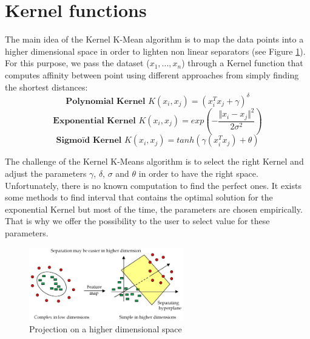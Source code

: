 \section{Kernel functions}
The main idea of the Kernel K-Mean algorithm is to map the data points into a higher dimensional space in order to lighten non linear separators (see Figure \ref{kern}). For this purpose, we pass the dataset ($x_1,...,x_n$) through a Kernel function that computes affinity between point using different approaches from simply finding the shortest distances:\\
\begin{equation}
\textbf{Polynomial Kernel }K(x_i,x_j) = (x_i^Tx_j + \gamma)^{\delta}
\end{equation}
\begin{equation}
\textbf{Exponential Kernel }K(x_i,x_j) = exp(-\frac{\Vert x_i-x_j\Vert^2}{2\sigma^2})
\end{equation}
\begin{equation}
\textbf{Sigmoïd Kernel }K(x_i,x_j) = tanh(\gamma (x_i^Tx_j) + \theta)
\end{equation}

The challenge of the Kernel K-Means algorithm is to select the right Kernel and adjust the parameters $\gamma$, $\delta$, $\sigma$ and $\theta$ in order to have the right space. Unfortunately, there is no known computation to find the perfect ones. It exists some methods to find interval that contains the optimal solution for the exponential Kernel but most of the time, the parameters are chosen empirically. That is why we offer the possibility to the user to select value for these parameters.
\begin{figure}[h!]
\includegraphics[width=0.6\textwidth]{Image/algo-kern.png}\centering
\caption{Projection on a higher dimensional space\label{kern}}
\end{figure}
